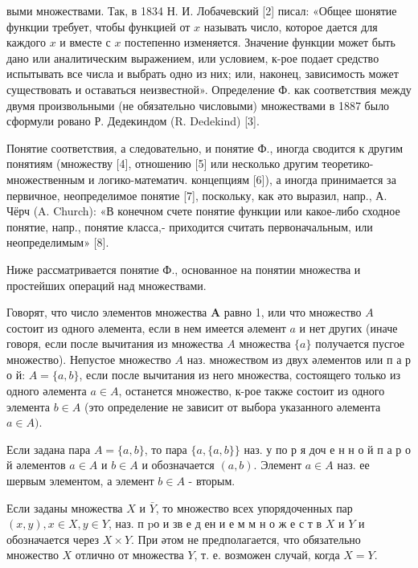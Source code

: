 \documentclass[10pt]{article}
\begin{document}
выми множествами. Так, в 1834 Н. И. Лобачевский [2] писал: «Общее шонятие функции требует, чтобы функцией от $x$ называть число, которое дается для каждого $x$ и вместе с $x$ постепенно изменяется. Значение функции может быть дано или аналитическим выражением, или условием, к-рое подает средство испытывать все числа и выбрать одно из них; или, наконец, зависимость может существовать и оставаться неизвестной». Определение Ф. как соответствия между двумя произвольными (не обязательно числовыми) множествами в 1887 было сформули ровано Р. Дедекиндом (R. Dedekind) [3].



Понятие соответствия, а следовательно, и понятие Ф., иногда сводится к другим понятиям (множеству [4], отношению [5] или несколько другим теоретико-множественным и логико-математич. концепциям [6]), а иногда принимается за первичное, неопределимое понятие [7], поскольку, как әто выразил, напр., А. Чёрч (A. Church): «В конечном счете понятие функции или какое-либо сходное понятие, напр., понятие класса,- приходится считать первоначальным, или неопределимым» [8].



Ниже рассматривается понятие Ф., основанное на понятии множества и простейших операций над множествами.



Говорят, что число элементов множества $\boldsymbol{A}$ равно 1, или что множество $A$ состоит из одного әлемента, если в нем имеется әлемент $a$ и нет других (иначе говоря, если после вычитания из множества $A$ множества $\{a\}$ получается пусгое множество). Непустое множество $A$ наз. множеством из двух әлементов или п а р о й: $A=\{a, b\}$, если после вычитания из него множества, состоящего только из одного әлемента $a \in A$, останется множество, к-рое также состоит из одного элемента $b \in A$ (это определение не зависит от выбора указанного әлемента $a \in A)$.



Если задана пара $A=\{a, b\}$, то пара $\{a,\{a, b\}\}$ наз. у по р я доч е н н о й п а р о й әлементов $a \in A$ и $b \in A$ и обозначается $(a, b)$. Элемент $a \in A$ наз. ее шервым элементом, а элемент $b \in A$ - вторым.



Если заданы множества $X$ и $\bar{Y}$, то множество всех упорядоченных пар $(x, y), x \in X, y \in Y$, наз. п $\mathrm{p} о$ и зв е д ен и е м м н о ж е с т в $X$ и $Y$ и обозначается через $X \times Y$. При әтом не предполагается, что обязательно множество $X$ отлично от множества $Y$, т. е. возможен случай, когда $X=Y$.
\end{document}
